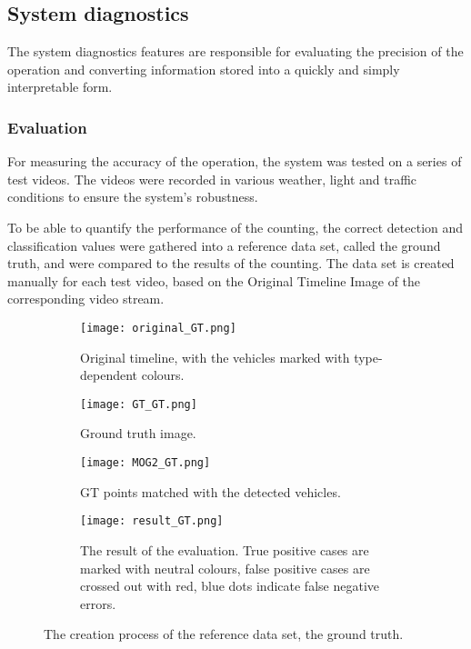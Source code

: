 \subsection{System diagnostics}
The system diagnostics features are responsible for evaluating the precision of the operation and converting information stored into a quickly and simply interpretable form.

\subsubsection{Evaluation}
For measuring the accuracy of the operation, the system was tested on a series of test videos.
The videos were recorded in various weather, light and traffic conditions to ensure the system's robustness.

To be able to quantify the performance of the counting, the correct detection and classification values were gathered into a reference data set, called the ground truth, and were compared to the results of the counting.
The data set is created manually for each test video, based on the Original Timeline Image of the corresponding video stream.

\begin{figure}[!h]
	\centering
	\begin{subfigure}[!h]{0.9\textwidth}
		\texttt{[image: original\_GT.png]}
		\caption{Original timeline, with the vehicles marked with type-dependent colours.\label{fig:GT_original}}
	\end{subfigure}
	\hfill
	\begin{subfigure}[!h]{0.9\textwidth}
		\texttt{[image: GT\_GT.png]}
		\caption{Ground truth image.\label{fig:GT_GT}}
	\end{subfigure}
	\hfill
	\begin{subfigure}[!h]{0.9\textwidth}
		\texttt{[image: MOG2\_GT.png]}
		\caption{GT points matched with the detected vehicles. \label{fig:GT_MOG}}
	\end{subfigure}
	\hfill
	\begin{subfigure}[!h]{0.9\textwidth}
		\texttt{[image: result\_GT.png]}
		\caption{The result of the evaluation. True positive cases are marked with neutral colours, false positive cases are crossed out with red, blue dots indicate false negative errors.\label{fig:GT_result}}
	\end{subfigure}
	\caption{The creation process of the reference data set, the ground truth.\label{fig:GT}}
\end{figure}

